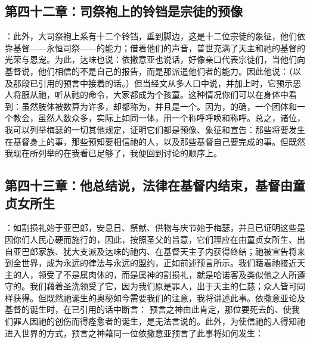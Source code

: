 
\subsection{第四十二章：司祭袍上的铃铛是宗徒的预像}

：此外，大司祭袍上系有十二个铃铛，垂到脚边，这是十二位宗徒的象征，他们依靠基督——永恒司祭——的能力；借着他们的声音，普世充满了天主和祂的基督的光荣与恩宠。为此，达味也说：依撒意亚也说话，好像亲口代表宗徒们，当他们向基督说，他们相信的不是自己的报告，而是那派遣他们者的能力。因此他说：（以及那段已引用的预言中接着的话。）但当经文从多人口中说，并加上时，它预示恶人将服从祂，听从祂的命令，大家都成为个孩童。这种情况你们可以在身体中看到：虽然肢体被数算为许多，却都称为，并且是一个。因为，的确，一个团体和一个教会，虽然人数众多，实际上如同一体，用一个称呼呼唤和称呼。总之，诸位，我可以列举梅瑟的一切其他规定，证明它们都是预像、象征和宣告：那些将要发生在基督身上的事，那些预知要相信祂的人，以及那些基督自己要完成的事。但既然我现在所列举的在我看已足够了，我便回到讨论的顺序上。\par


\subsection{第四十三章：他总结说，法律在基督内结束，基督由童贞女所生}

：如割损礼始于亚巴郎，安息日、祭献、供物与庆节始于梅瑟，并且已证明这些是因你们人民心硬而施行的，因此，按照圣父的旨意，它们理应在由童贞女所生、出自亚巴郎家族、犹大支派及达味的祂内、在基督天主子内获得终结；祂被宣告将来到全世界，成为永远的律法与永远的盟约，正如前述预言所示。我们藉着祂接近天主的人，领受了不是属肉体的，而是属神的割损礼，就是哈诺客及类似他之人所遵守的。我们藉着圣洗领受了它，因为我们原是罪人，出于天主的仁慈；众人皆可同样获得。但既然祂诞生的奥秘如今需要我们的注意，我将讲述此事。依撒意亚论及基督的诞生时，在已引用的话中断言：  预言之神由此肯定，那位要死去的、使我们罪人因祂的创伤而得痊愈者的诞生，是无法言说的。此外，为使信祂的人得知祂进入世界的方式，预言之神藉同一位依撒意亚预言了此事将如何发生：\par

